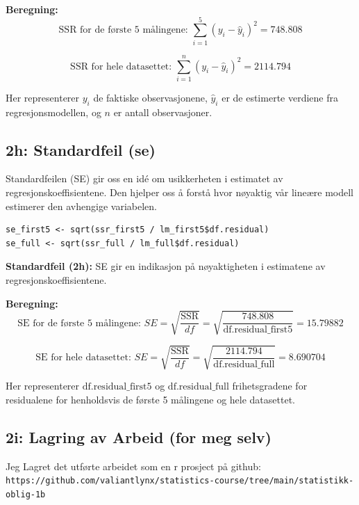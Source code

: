 \documentclass{article}
\begin{document}
\textbf{Beregning:}
\[ \text{SSR for de første 5 målingene: } \sum_{i=1}^{5} (y_i - \hat{y}_i)^2 = 748.808 \]

\[ \text{SSR for hele datasettet: } \sum_{i=1}^{n} (y_i - \hat{y}_i)^2 = 2114.794 \]

Her representerer \(y_i\) de faktiske observasjonene, \(\hat{y}_i\) er de estimerte verdiene fra regresjonsmodellen, og \(n\) er antall observasjoner.

\subsection{2h: Standardfeil (se)}
Standardfeilen (SE) gir oss en idé om usikkerheten i estimatet av regresjonskoeffisientene. Den hjelper oss å forstå hvor nøyaktig vår lineære modell estimerer den avhengige variabelen.

\begin{lstlisting}[style=Rstyle]
se_first5 <- sqrt(ssr_first5 / lm_first5$df.residual)
se_full <- sqrt(ssr_full / lm_full$df.residual)
\end{lstlisting}

\textbf{Standardfeil (2h):} SE gir en indikasjon på nøyaktigheten i estimatene av regresjonskoeffisientene.

\textbf{Beregning:}
\[ \text{SE for de første 5 målingene: } SE = \sqrt{\frac{\text{SSR}}{df}} = \sqrt{\frac{748.808}{\text{df.residual\_first5}}} = 15.79882 \]

\[ \text{SE for hele datasettet: } SE = \sqrt{\frac{\text{SSR}}{df}} = \sqrt{\frac{2114.794}{\text{df.residual\_full}}} = 8.690704 \]

Her representerer \(\text{df.residual\_first5}\) og \(\text{df.residual\_full}\) frihetsgradene for residualene for henholdsvis de første 5 målingene og hele datasettet.

\subsection{2i: Lagring av Arbeid (for meg selv)}
Jeg Lagret det utførte arbeidet som en r prosject på github: \\ 
\texttt{https://github.com/valiantlynx/statistics-course/tree/main/statistikk-oblig-1b}
\end{document}

